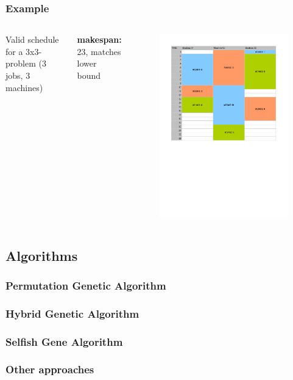 \begin{frame}
	\frametitle{Example}
	
	\begin{columns}[c]

Valid schedule for a 3x3-problem (3 jobs, 3 machines)

\textbf{makespan:} 23, matches lower bound

\begin{figure}
	\includegraphics[width=\linewidth]{example-schedule.pdf}
	
\end{figure}
\end{columns}
	
\end{frame}

\subsection{Algorithms}
\begin{frame}
  \frametitle{Permutation Genetic Algorithm}


\end{frame}

\begin{frame}
  \frametitle{Hybrid Genetic Algorithm}
\end{frame}

\begin{frame}
  \frametitle{Selfish Gene Algorithm}
\end{frame}

\begin{frame}
  \frametitle{Other approaches}
\end{frame}